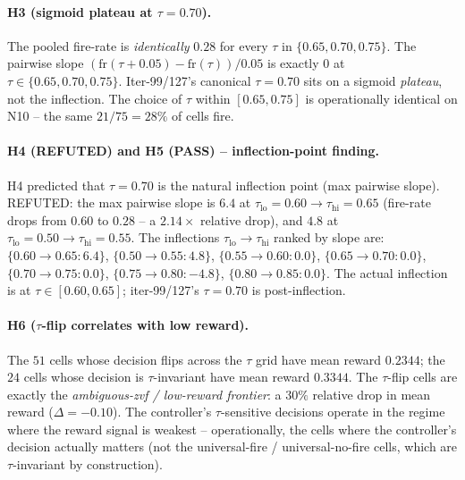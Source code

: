 \paragraph{H3 (sigmoid plateau at $\tau=0.70$).}
The pooled fire-rate is \emph{identically} $0.28$ for every $\tau$ in
$\{0.65, 0.70, 0.75\}$. The pairwise slope
$(\mathrm{fr}(\tau{+}0.05) - \mathrm{fr}(\tau)) / 0.05$ is exactly
$0$ at $\tau \in \{0.65, 0.70, 0.75\}$. Iter-99/127's canonical
$\tau=0.70$ sits on a sigmoid \emph{plateau}, not the inflection.
The choice of $\tau$ within $[0.65, 0.75]$ is operationally identical on
N10 -- the same $21/75 = 28\%$ of cells fire.

\paragraph{H4 (REFUTED) and H5 (PASS) -- inflection-point finding.}
H4 predicted that $\tau=0.70$ is the natural inflection point (max
pairwise slope). REFUTED: the max pairwise slope is $6.4$ at
$\tau_\mathrm{lo}=0.60 \to \tau_\mathrm{hi}=0.65$ (fire-rate drops from
$0.60$ to $0.28$ -- a $2.14\times$ relative drop), and $4.8$ at
$\tau_\mathrm{lo}=0.50 \to \tau_\mathrm{hi}=0.55$. The inflections
$\tau_\mathrm{lo} \to \tau_\mathrm{hi}$ ranked by slope are:
$\{0.60\to0.65: 6.4\}$, $\{0.50\to0.55: 4.8\}$, $\{0.55\to0.60: 0.0\}$,
$\{0.65\to0.70: 0.0\}$, $\{0.70\to0.75: 0.0\}$, $\{0.75\to0.80: -4.8\}$,
$\{0.80\to0.85: 0.0\}$. The actual inflection is at $\tau \in [0.60, 0.65]$;
iter-99/127's $\tau=0.70$ is post-inflection.

\paragraph{H6 ($\tau$-flip correlates with low reward).}
The $51$ cells whose decision flips across the $\tau$ grid have mean
reward $0.2344$; the $24$ cells whose decision is $\tau$-invariant have
mean reward $0.3344$. The $\tau$-flip cells are exactly the
\emph{ambiguous-zvf / low-reward frontier}: a $30\%$ relative drop in
mean reward ($\Delta = -0.10$). The controller's $\tau$-sensitive
decisions operate in the regime where the reward signal is weakest --
operationally, the cells where the controller's decision actually
matters (not the universal-fire / universal-no-fire cells, which are
$\tau$-invariant by construction).

